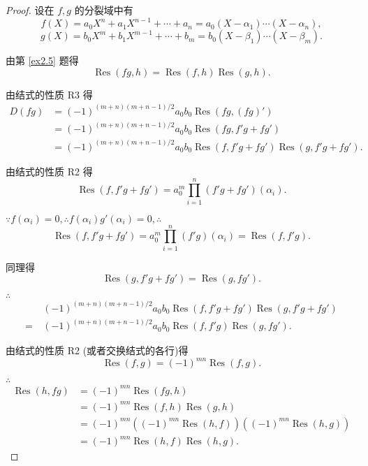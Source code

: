 \documentclass[UTF8]{ctexart}
\begin{document}
\begin{proof}
    设在 $f,g$ 的分裂域中有
    \[f(X)=a_0X^n+a_1X^{n-1}+\cdots+a_n=a_0(X-\alpha_1)\cdots(X-\alpha_n),\]
    \[g(X)=b_0X^m+b_1X^{m-1}+\cdots+b_m=b_0(X-\beta_1)\cdots(X-\beta_m).\]

    由第 \ref{ex2.5} 题得
    \[\operatorname{Res}(fg,h)=\operatorname{Res}(f,h)\operatorname{Res}(g,h).\]

    由结式的性质 R3 得
    \begin{align*}
        D(fg) & =(-1)^{(m+n)(m+n-1)/2}a_0b_0\operatorname{Res}(fg,(fg)') \\
        & =(-1)^{(m+n)(m+n-1)/2}a_0b_0\operatorname{Res}(fg,f'g+fg') \\
        & =(-1)^{(m+n)(m+n-1)/2}a_0b_0\operatorname{Res}(f,f'g+fg')\operatorname{Res}(g,f'g+fg').
    \end{align*}

    由结式的性质 R2 得
    \[\operatorname{Res}(f,f'g+fg')=a_0^m\prod\limits_{i=1}^n(f'g+fg')(\alpha_i).\]

    $\because f(\alpha_i)=0,\therefore f(\alpha_i)g'(\alpha_i)=0,\therefore$
    \[\operatorname{Res}(f,f'g+fg')=a_0^m\prod\limits_{i=1}^n(f'g)(\alpha_i)=\operatorname{Res}(f,f'g).\]

    同理得
    \[\operatorname{Res}(g,f'g+fg')=\operatorname{Res}(g,fg').\]

    $\therefore$
    \begin{align*}
        & (-1)^{(m+n)(m+n-1)/2}a_0b_0\operatorname{Res}(f,f'g+fg')\operatorname{Res}(g,f'g+fg') \\
        =\  & (-1)^{(m+n)(m+n-1)/2}a_0b_0\operatorname{Res}(f,f'g)\operatorname{Res}(g,fg').
    \end{align*}

    由结式的性质 R2 (或者交换结式的各行)得
    \[\operatorname{Res}(f,g)=(-1)^{mn}\operatorname{Res}(f,g).\]

    $\therefore$
    \begin{align*}
        \operatorname{Res}(h,fg) & =(-1)^{mn}\operatorname{Res}(fg,h) \\
        & =(-1)^{mn}\operatorname{Res}(f,h)\operatorname{Res}(g,h) \\
        & =(-1)^{mn}((-1)^{mn}\operatorname{Res}(h,f))((-1)^{mn}\operatorname{Res}(h,g)) \\
        & =(-1)^{mn}\operatorname{Res}(h,f)\operatorname{Res}(h,g).
    \end{align*}


\end{proof}
\end{document}
